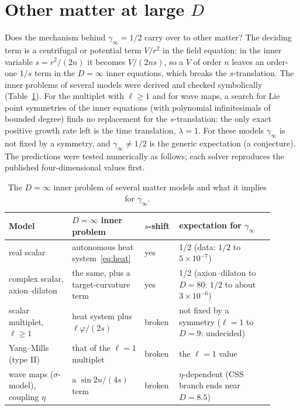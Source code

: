\documentclass[aps,prd,onecolumn,superscriptaddress,nofootinbib,10pt]{revtex4-2}
\begin{document}
\section{Other matter at large $D$}
\label{sec:matter}

Does the mechanism behind $\gamma_\infty = 1/2$ carry over to other matter? The deciding term is a centrifugal or
potential term $V/r^2$ in the field equation: in the inner variable $s = r^2/(2n)$ it becomes $V/(2ns)$, so a $V$ of order
$n$ leaves an order-one $1/s$ term in the $D = \infty$ inner equations, which breaks the $s$-translation. The inner
problems of several models were derived and checked symbolically (Table~\ref{tab:matter}). For the multiplet with
$\ell \ge 1$ and for wave maps, a search for Lie point symmetries of the inner equations (with polynomial infinitesimals
of bounded degree) finds no replacement for the $s$-translation: the only exact positive growth rate left is the time
translation, $\lambda = 1$. For these models $\gamma_\infty$ is not fixed by a symmetry, and $\gamma_\infty \ne 1/2$ is the
generic expectation (a conjecture). The predictions were tested numerically as follows; each solver reproduces the
published four-dimensional values first.

\begin{table}[htbp]
\caption{The $D = \infty$ inner problem of several matter models and what it implies for $\gamma_\infty$.}
\label{tab:matter}
\footnotesize
\begin{ruledtabular}
\begin{tabular}{p{0.22\linewidth}p{0.25\linewidth}p{0.1\linewidth}p{0.33\linewidth}}
Model & $D = \infty$ inner problem & $s$-shift & expectation for $\gamma_\infty$ \\ \hline
real scalar & autonomous heat system~\eqref{eq:heat} & yes & 1/2 (data: $1/2$ to $5\times10^{-7}$) \\
complex scalar, axion--dilaton & the same, plus a target-curvature term & yes & 1/2 (axion--dilaton to $D = 80$: $1/2$ to
about $3\times10^{-6}$) \\
scalar multiplet, $\ell \ge 1$ & heat system plus $\ell\varphi/(2s)$ & broken & not fixed by a symmetry ($\ell = 1$ to
$D = 9$: undecided) \\
Yang--Mills (type II) & that of the $\ell = 1$ multiplet & broken & the $\ell = 1$ value \\
wave maps ($\sigma$-model), coupling $\eta$ & a $\sin 2u/(4s)$ term & broken & $\eta$-dependent (CSS branch ends near
$D = 8.5$) \\
\end{tabular}
\end{ruledtabular}
\end{table}
\end{document}
